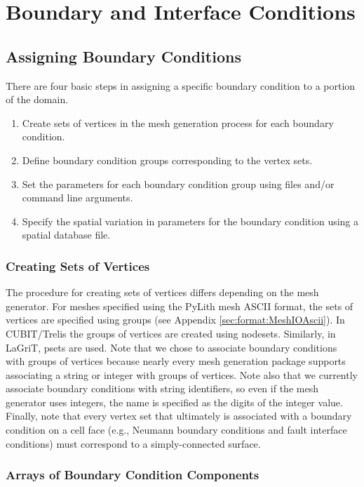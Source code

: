 \chapter{Boundary and Interface Conditions}
\label{cha:boundary:interface:conditions}

\section{Assigning Boundary Conditions}

There are four basic steps in assigning a specific boundary condition
to a portion of the domain.
\begin{enumerate}
\item Create sets of vertices in the mesh generation process for each boundary
  condition.
\item Define boundary condition groups corresponding to the vertex sets.
\item Set the parameters for each boundary condition group using
   files and/or command line
  arguments.
\item Specify the spatial variation in parameters for the boundary
  condition using a spatial database file.
\end{enumerate}

\subsection{Creating Sets of Vertices}

The procedure for creating sets of vertices differs depending on the
mesh generator. For meshes specified using the PyLith mesh ASCII
format, the sets of vertices are specified using groups (see Appendix
\vref{sec:format:MeshIOAscii}).  In CUBIT/Trelis the groups of
vertices are created using nodesets. Similarly, in LaGriT, psets are
used. Note that we chose to associate boundary conditions with groups
of vertices because nearly every mesh generation package supports
associating a string or integer with groups of vertices.  Note also
that we currently associate boundary conditions with string
identifiers, so even if the mesh generator uses integers, the name is
specified as the digits of the integer value. Finally, note that every
vertex set that ultimately is associated with a boundary condition on
a cell face (e.g., Neumann boundary conditions and fault interface
conditions) must correspond to a simply-connected surface.

\subsection{Arrays of Boundary Condition Components}

